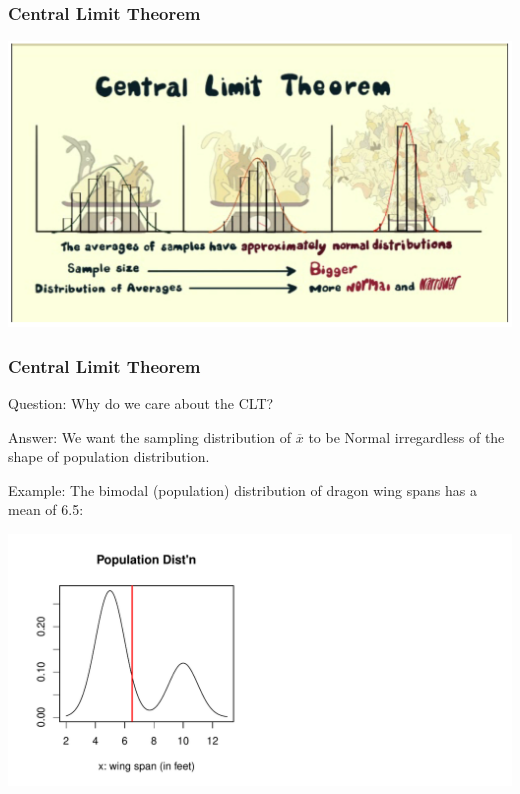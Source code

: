 \documentclass[slides]{beamer}
\newcommand{\blue}[1]{\textcolor{blue2}{#1}}
\newcommand{\xbar}{\overline{x}}
\begin{document}
\begin{frame}
\frametitle{Central Limit Theorem}
\begin{center}
\includegraphics[width=\textwidth]{figure/CLT.png}
\end{center}
\end{frame}


\begin{frame}
\frametitle{Central Limit Theorem}
\blue{Question}:  Why do we care about the CLT?

\vspace{0.25cm}

\pause\blue{Answer}:  We want the sampling distribution of $\xbar$ to be Normal \blue{irregardless} of the shape of population distribution.

\vspace{0.25cm}

\pause\blue{Example}:  The bimodal (population) distribution of dragon wing spans has a mean of 6.5:

\pause\begin{center}
\includegraphics[width=\textwidth]{figure/CLT1.pdf}
\end{center}

\end{frame}
\end{document}
